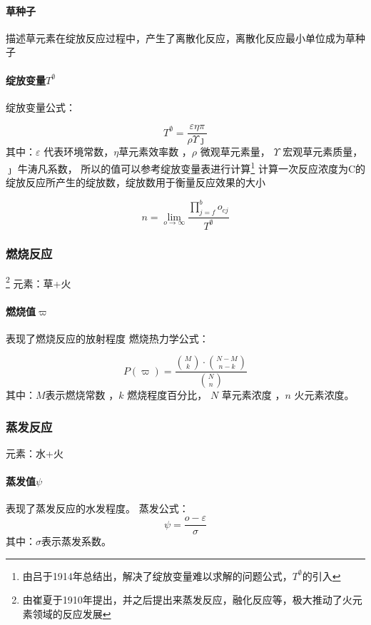 \documentclass[12pt,a4paper]{article}%
\begin{document}
\paragraph{草种子}  描述草元素在绽放反应过程中，产生了离散化反应，离散化反应最小单位成为草种子
\paragraph{绽放变量$T^{\emptyset}$} 
绽放变量公式：

\begin{equation}
	T^{\emptyset}=\frac{ \varepsilon \eta \pi }{\rho \Upsilon \jmath }
	\end{equation}
	其中：$\varepsilon$ 代表环境常数，$\eta $草元素效率数  ，$\rho$ 微观草元素量， $ \Upsilon$ 宏观草元素质量， $\jmath$  牛涛凡系数，
	所以的值可以参考绽放变量表进行计算\footnote[9]{由吕于1914年总结出，解决了绽放变量难以求解的问题公式，$T^{\emptyset}$的引入} 
计算一次反应浓度为C的绽放反应所产生的绽放数，绽放数用于衡量反应效果的大小

\begin{equation}
n=\lim_{o \to \infty}\frac{\prod_{j=f}^{b} o_{cj}}{T^{\emptyset } } 
\end{equation}

\subsubsection{燃烧反应}\footnote[11]{由崔夏于1910年提出，并之后提出来蒸发反应，融化反应等，极大推动了火元素领域的反应发展}
元素：草+火\\
\paragraph{燃烧值$ \varpi $} 表现了燃烧反应的放射程度
燃烧热力学公式：

\begin{equation}
P\left ( \varpi \right ) = \frac{\binom{M}{k}\cdot \binom{N-M}{n-k}}{\binom{N}{n}} 
\end{equation}
其中：$M$表示燃烧常数 ，$k$ 燃烧程度百分比， $N$ 草元素浓度 ，$n$ 火元素浓度。


\subsubsection{蒸发反应}
元素：水+火\\
\paragraph{蒸发值$ \psi  $} 表现了蒸发反应的水发程度。
蒸发公式：
\begin{equation}
	\psi =\frac{o-\varepsilon }{\sigma} 
\end{equation}
其中：$\sigma$表示蒸发系数。
\end{document}

